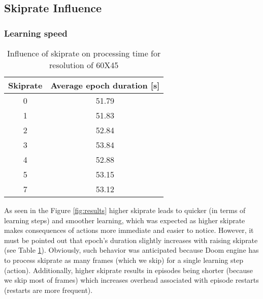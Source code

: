 	\subsection{Skiprate Influence}
			
			
		\subsubsection*{Learning speed} 

			\begin{table}
				\begin{center}
					\begin{tabular}{ |c | c |}
						\hline
						Skiprate & Average epoch duration [s] \\ \hline
						0 & 51.79 \\ \hline
						1 & 51.83 \\ \hline
						2 & 52.84 \\ \hline
						3 & 53.84 \\ \hline
						4 & 52.88 \\ \hline
						5 & 53.15 \\ \hline
						7 & 53.12 \\ \hline
					\end{tabular}
				\end{center}
				\caption{Influence of skiprate on processing time for resolution of 60X45}\label{tab:time_results}
			\end{table}
			As seen in the Figure \ref{fig:results} higher skiprate leads to quicker (in terms of learning steps) and smoother learning, which was expected as higher skiprate makes consequences of actions more immediate and easier to notice. However, it must be pointed out that epoch's duration slightly increases with raising skiprate (see Table \ref{tab:time_results}). Obviously, such behavior was anticipated because Doom engine has to process skiprate as many frames (which we skip) for a single learning step (action). Additionally, higher skiprate results in episodes being shorter (because we skip most of frames) which increases overhead associated with episode restarts (restarts are more frequent). 


